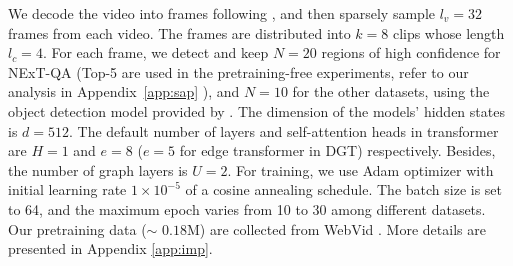 \documentclass[runningheads]{llncs}
\begin{document}
We decode the video into frames following \cite{xiao2021video}, and then sparsely sample $l_v=32$ frames from each video. The frames are distributed into $k=8$ clips whose length $l_c=4$.
For each frame, we detect and keep $N=20$ regions of high confidence for NExT-QA (Top-5 are used in the pretraining-free experiments, refer to our analysis in Appendix~\ref{app:sap}
), and $N=10$ for the other datasets, using the object detection model provided by \cite{anderson2018bottom}. The dimension of the models' hidden states is $d=512$. The default number of layers and self-attention heads in transformer are $H=1$ and $e=8$ ($e=5$ for edge transformer in DGT) respectively. Besides, the number of graph layers is $U=2$. For training, 
we use Adam optimizer with initial learning rate $1\times10^{-5}$ of a cosine annealing schedule. The batch size is set to 64, and the maximum epoch varies from 10 to 30 among different datasets. Our pretraining data ($\sim$ $0.18$M) are collected from WebVid \cite{bain2021frozen}. More details are presented in Appendix \ref{app:imp}.
\end{document}
